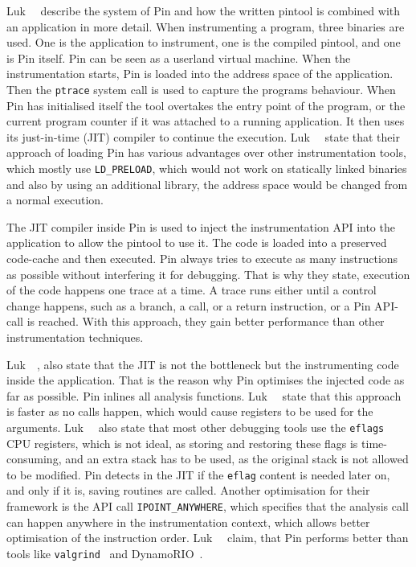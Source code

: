 Luk~\etal~\cite{pintool} describe the system of Pin and how the written pintool
is combined with an application in more detail. When instrumenting a program,
three binaries are used. One is the application to instrument, one is the
compiled pintool, and one is Pin itself. Pin can be seen as a userland virtual
machine. When the instrumentation starts, Pin is loaded into the address space
of the application. Then the \texttt{ptrace} system call is used to capture the
program\textquotesingle s behaviour. When Pin has initialised itself the tool
overtakes the entry point of the program, or the current program counter if it
was attached to a running application. It then uses its just-in-time (JIT)
compiler to continue the execution. Luk~\etal~\cite{pintool} state that their
approach of loading Pin has various advantages over other instrumentation tools,
which mostly use \texttt{LD\_PRELOAD}, which would not work on statically linked
binaries and also by using an additional library, the address space would be
changed from a normal execution.

The JIT compiler inside Pin is used to inject the instrumentation API into the
application to allow the pintool to use it. The code is loaded into a preserved
code-cache and then executed. Pin always tries to execute as many instructions
as possible without interfering it for debugging. That is why they state,
execution of the code happens one trace at a time. A trace runs either until a
control change happens, such as a branch, a call, or a return instruction, or a
Pin API-call is reached. With this approach, they gain better performance than
other instrumentation techniques.

Luk~\etal~\cite{pintool}, also state that the JIT is not the bottleneck but the
instrumenting code inside the application. That is the reason why Pin optimises
the injected code as far as possible. Pin inlines all analysis functions.
Luk~\etal~\cite{pintool} state that this approach is faster as no calls happen,
which would cause registers to be used for the arguments.
Luk~\etal~\cite{pintool} also state that most other debugging tools use the
\texttt{eflags} CPU registers, which is not ideal, as storing and restoring
these flags is time-consuming, and an extra stack has to be used, as the
original stack is not allowed to be modified. Pin detects in the JIT if the
\texttt{eflag} content is needed later on, and only if it is, saving routines
are called. Another optimisation for their framework is the API call
\texttt{IPOINT\_ANYWHERE}, which specifies that the analysis call can happen
anywhere in the instrumentation context, which allows better optimisation of the
instruction order. Luk~\etal~\cite{pintool} claim, that Pin performs better than
tools like \texttt{valgrind}~\cite{valgrind} and DynamoRIO~\cite{dynrio}.

